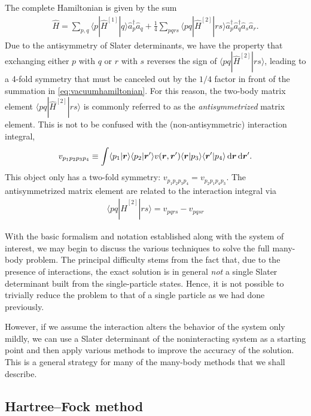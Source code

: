The complete Hamiltonian is given by the sum
\begin{align}
  \hat{H} = \sum_{p,q} \langle p | \hat{H}^{[1]} | q \rangle \hat{a}_p^\dagger \hat{a}_q + \frac{1}{4} \sum_{pqrs} \langle pq | \hat{H}^{[2]} | rs \rangle \hat{a}_p^\dagger \hat{a}_q^\dagger \hat{a}_s \hat{a}_r . \label{eq:vacuumhamiltonian}
\end{align}
Due to the antisymmetry of Slater determinants, we have the property
that exchanging either $p$ with $q$ or $r$ with $s$ reverses the sign
of $\langle pq | \hat{H}^{[2]} | rs \rangle$, leading to a 4-fold
symmetry that must be canceled out by the $1/4$ factor in front of the
summation in \eqref{eq:vacuumhamiltonian}.  For this reason, the
two-body matrix element $\langle pq | \hat{H}^{[2]} | rs \rangle$
is commonly referred to as the \emph{antisymmetrized} matrix element.
This is not to be confused with the (non-antisymmetric) interaction
integral,
\begin{align} \label{eq:interactionintegral}
  v_{p_1p_2p_3p_4} \equiv \int \langle p_1 | \bm{r} \rangle \langle p_2 | \bm{r}' \rangle v(\bm r, \bm r') \langle \bm{r} | p_3 \rangle \langle \bm{r}' | p_4 \rangle \operatorname{d\!} \bm{r} \operatorname{d\!} \bm{r}'.
\end{align}
This object only has a two-fold symmetry: $v_{p_1p_2p_3p_4} = v_{p_2p_1p_4p_3}$.  The antisymmetrized matrix element are related to the interaction integral via
\begin{align} \label{eq:antisymmetricmatrixelement}
  \langle pq | \hat{H}^{[2]} | rs \rangle = v_{pqrs} - v_{pqsr}
\end{align}

With the basic formalism and notation established along with the
system of interest, we may begin to discuss the various techniques to
solve the full many-body problem.  The principal difficulty stems from
the fact that, due to the presence of interactions, the exact solution
is in general \emph{not} a single Slater determinant built from the
single-particle states.  Hence, it is not possible to trivially reduce
the problem to that of a single particle as we had done previously.

However, if we assume the interaction alters the behavior of the
system only mildly, we can use a Slater determinant of the
noninteracting system as a starting point and then apply various
methods to improve the accuracy of the solution.  This is a general
strategy for many of the many-body methods that we shall describe.

\subsection{Hartree--Fock method}
\label{subsec:HartreeFockmethod}

